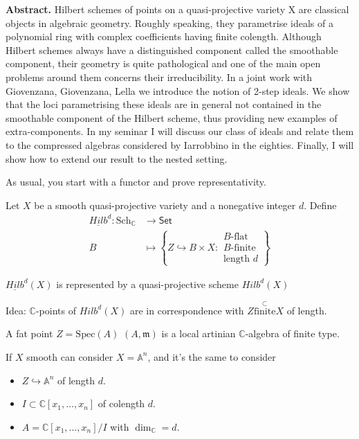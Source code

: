 \medskip\noindent
{\bf Abstract.}
Hilbert schemes of points on a
quasi-projective variety X are classical
objects
in algebraic geometry. Roughly speaking, they
parametrise ideals of a polynomial
ring with complex coefficients having finite
colength. Although Hilbert schemes
always have a distinguished component called
the smoothable component, their
geometry is quite pathological and one of the
main open problems around them
concerns their irreducibility. In a joint
work with Giovenzana, Giovenzana,
Lella we introduce the notion of 2-step
ideals. We show that the loci
parametrising these ideals are in general not
contained in the smoothable
component of the Hilbert scheme, thus
providing new examples of
extra-components.  In my seminar I will
discuss our class of ideals and relate
them to the compressed algebras considered by
Iarrobbino in the eighties.
Finally, I will show how to extend our result
to the nested setting.


\medskip\noindent

As usual, you start with a functor and
prove representativity.

\begin{definition}
\label{definition-hilbert-scheme}
Let $X$ be a smooth
quasi-projective variety and a nonegative
integer $d$.
Define
$$
\begin{aligned}
\underline{Hilb}^d: \text{Sch}_\mathbb{C}
&\longrightarrow \mathsf{Set} \\
B &\longmapsto \left\{Z \hookrightarrow B
\times X:
\substack{B\text{-flat} \\ B\text{-finite}\\
\text{length }d}\right\}
\end{aligned}
$$
\end{definition}

\begin{theorem}[Grothendieck]
\label{theorem-grothendieck}
$\underline{Hilb}^d(X)$ is represented by a
quasi-projective
scheme $Hilb^d(X)$
\end{theorem}

Idea: $\mathbb{C}$-points of $Hilb^d(X)$
are in correspondence with $Z
\overset{\subset}{\text{finite}}X$
of length.

A fat point $Z= \text{Spec}(A)$ $(A,
\mathfrak{m})$ is a
local artinian $\mathbb{C}$-algebra of finite
type.

If $X$ smooth can consider $X=\mathbb{A}^n$,
and it's the same to consider
\begin{itemize}
\item $Z \hookrightarrow \mathbb{A}^n$ of
length $d$.
\item $I \subset \mathbb{C}[x_1,\ldots,x_n]$
of
colength $d$.
\item $A= \mathbb{C}[x_1,\ldots,x_n]/I$ with
$\dim_\mathbb{C}=d$.
\end{itemize}

